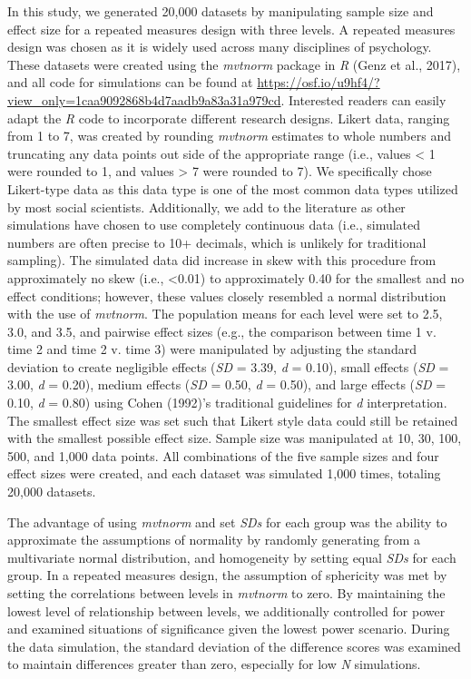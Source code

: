 \documentclass[,man, mask]{apa6}
\theoremstyle{definition}
\theoremstyle{definition}
\theoremstyle{definition}
\theoremstyle{remark}
\begin{document}
In this study, we generated 20,000 datasets by manipulating sample size
and effect size for a repeated measures design with three levels. A
repeated measures design was chosen as it is widely used across many
disciplines of psychology. These datasets were created using the
\emph{mvtnorm} package in \emph{R} (Genz et al., 2017), and all code for
simulations can be found at
\url{https://osf.io/u9hf4/?view_only=1caa9092868b4d7aadb9a83a31a979cd}.
Interested readers can easily adapt the \emph{R} code to incorporate
different research designs. Likert data, ranging from 1 to 7, was
created by rounding \emph{mvtnorm} estimates to whole numbers and
truncating any data points out side of the appropriate range (i.e.,
values \textless{} 1 were rounded to 1, and values \textgreater{} 7 were
rounded to 7). We specifically chose Likert-type data as this data type
is one of the most common data types utilized by most social scientists.
Additionally, we add to the literature as other simulations have chosen
to use completely continuous data (i.e., simulated numbers are often
precise to 10+ decimals, which is unlikely for traditional sampling).
The simulated data did increase in skew with this procedure from
approximately no skew (i.e., \textless{}0.01) to approximately 0.40 for
the smallest and no effect conditions; however, these values closely
resembled a normal distribution with the use of \emph{mvtnorm}. The
population means for each level were set to 2.5, 3.0, and 3.5, and
pairwise effect sizes (e.g., the comparison between time 1 v. time 2 and
time 2 v. time 3) were manipulated by adjusting the standard deviation
to create negligible effects (\emph{SD} = 3.39, \emph{d} = 0.10), small
effects (\emph{SD} = 3.00, \emph{d} = 0.20), medium effects (\emph{SD} =
0.50, \emph{d} = 0.50), and large effects (\emph{SD} = 0.10, \emph{d} =
0.80) using Cohen (1992)'s traditional guidelines for \emph{d}
interpretation. The smallest effect size was set such that Likert style
data could still be retained with the smallest possible effect size.
Sample size was manipulated at 10, 30, 100, 500, and 1,000 data points.
All combinations of the five sample sizes and four effect sizes were
created, and each dataset was simulated 1,000 times, totaling 20,000
datasets.

The advantage of using \emph{mvtnorm} and set \emph{SDs} for each group
was the ability to approximate the assumptions of normality by randomly
generating from a multivariate normal distribution, and homogeneity by
setting equal \emph{SDs} for each group. In a repeated measures design,
the assumption of sphericity was met by setting the correlations between
levels in \emph{mvtnorm} to zero. By maintaining the lowest level of
relationship between levels, we additionally controlled for power and
examined situations of significance given the lowest power scenario.
During the data simulation, the standard deviation of the difference
scores was examined to maintain differences greater than zero,
especially for low \emph{N} simulations.
\end{document}
